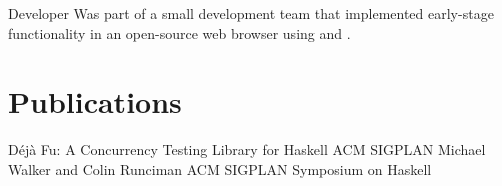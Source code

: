 \documentclass[a4paper]{barrucadu-cv}
\begin{document}
  {Developer}
  {}
  {Was part of a small development team that implemented early-stage
    functionality in an open-source web browser using  and
    .}

\section{Publications}

  {Déjà Fu: A Concurrency Testing Library for Haskell}
  {ACM SIGPLAN}
  {Michael Walker and Colin Runciman}
  {ACM SIGPLAN Symposium on Haskell}
\end{document}
